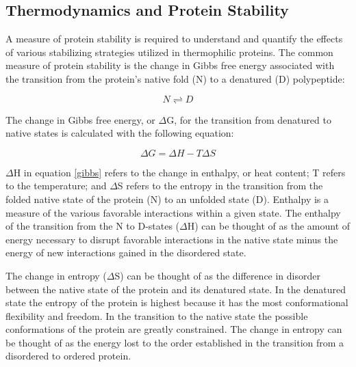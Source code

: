 {\subsection{Thermodynamics and Protein Stability}

A measure of protein stability is required to understand and quantify the
effects of various stabilizing strategies utilized in thermophilic proteins.
The common measure of protein stability is the change in Gibbs free energy
associated with the transition from the protein's native fold (N) to a
denatured (D) polypeptide:  

\begin{equation}\label{equ}
  N \rightleftharpoons D
\end{equation}

The change in Gibbs free energy, or $\Delta$G, for the transition from denatured
to native states is calculated with the following equation:

\begin{equation}\label{gibbs}
  \Delta G = \Delta H - T \Delta S
\end{equation}

$\Delta$H in equation \eqref{gibbs} refers to the change in enthalpy, or heat
content; T refers to the temperature; and $\Delta$S refers to the entropy in
the transition from the folded native state of the protein (N) to an unfolded state
(D).  Enthalpy is a measure of the various favorable interactions within a
given state.  The enthalpy of the transition from the N to D-states ($\Delta$H)
can be thought of as the amount of energy necessary to disrupt favorable
interactions in the native state minus the energy of new interactions
gained in the disordered state.


The change in entropy ($\Delta$S) can be thought of as the difference in disorder between
the native state of the protein and its denatured state. In the denatured state
the entropy of the protein is highest because it has the most conformational
flexibility and freedom.  In the transition to the native state the possible
conformations of the protein are greatly constrained. The change in entropy can
be thought of as the energy lost to the order established in the transition
from a disordered to ordered protein.

}

